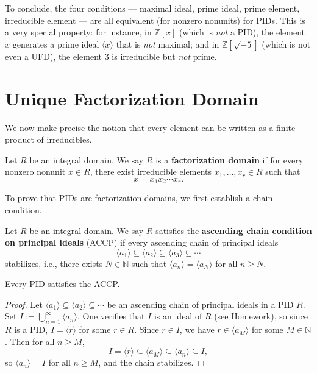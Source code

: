 To conclude, the four conditions — maximal ideal, prime ideal, prime element, irreducible element — are all equivalent (for nonzero nonunits) for PIDs. This is a very special property: for instance, in $\mathbb{Z}[x]$ (which is \emph{not} a PID), the element $x$ generates a prime ideal $\langle x \rangle$ that is \emph{not} maximal; and in $\mathbb{Z}[\sqrt{-5}]$ (which is not even a UFD), the element $3$ is irreducible but \emph{not} prime.

\section{Unique Factorization Domain}

We now make precise the notion that every element can be written as a finite product of irreducibles.

\begin{definition}
Let $R$ be an integral domain. We say $R$ is a \textbf{factorization domain} if for every nonzero nonunit $x \in R$, there exist irreducible elements $x_1, \dots, x_r \in R$ such that
\[
x = x_1 x_2 \cdots x_r.
\]
\end{definition}

To prove that PIDs are factorization domains, we first establish a chain condition.

\begin{definition}[ACCP]
Let $R$ be an integral domain. We say $R$ satisfies the \textbf{ascending chain condition on principal ideals} (ACCP) if every ascending chain of principal ideals
\[
\langle a_1 \rangle \subseteq \langle a_2 \rangle \subseteq \langle a_3 \rangle \subseteq \cdots
\]
stabilizes, i.e., there exists $N \in \mathbb{N}$ such that $\langle a_n \rangle = \langle a_N \rangle$ for all $n \geq N$.
\end{definition}

\begin{lemma}
Every PID satisfies the ACCP.
\end{lemma}

\begin{proof}
Let $\langle a_1 \rangle \subseteq \langle a_2 \rangle \subseteq \cdots$ be an ascending chain of principal ideals in a PID $R$. Set $I := \bigcup_{n=1}^{\infty} \langle a_n \rangle$. One verifies that $I$ is an ideal of $R$ (see Homework), so since $R$ is a PID, $I = \langle r \rangle$ for some $r \in R$. Since $r \in I$, we have $r \in \langle a_M \rangle$ for some $M \in \mathbb{N}$. Then for all $n \geq M$,
\[
I = \langle r \rangle \subseteq \langle a_M \rangle \subseteq \langle a_n \rangle \subseteq I,
\]
so $\langle a_n \rangle = I$ for all $n \geq M$, and the chain stabilizes.
\end{proof}


